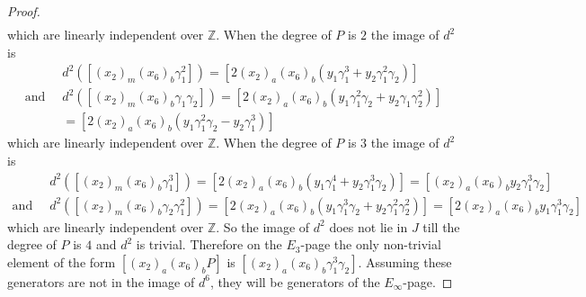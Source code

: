 \documentclass{article}
\theoremstyle{plain}
\theoremstyle{definition}
\numberwithin{thm}{section}
\begin{document}
\begin{proof}
\begin{align*}
			\end{align*}
			which are linearly independent over $\mathbb{Z}$.
			When the degree of $P$ is $2$ the image of $d^2$ is
			\begin{align*}
												&d^2([(x_2)_m(x_6)_b\gamma_1^2])=[2(x_2)_a(x_6)_b(y_1\gamma_1^3+y_2\gamma_1^2\gamma_2)] \\
				\text{and} \;\; &d^2([(x_2)_m(x_6)_b\gamma_1\gamma_2])=[2(x_2)_a(x_6)_b(y_1\gamma_1^2\gamma_2+y_2\gamma_1\gamma_2^2)] \\
																															&=[2(x_2)_a(x_6)_b(y_1\gamma_1^2\gamma_2-y_2\gamma_1^3)]
			\end{align*}
			which are linearly independent over $\mathbb{Z}$.
			When the degree of $P$ is $3$ the image of $d^2$ is
			\begin{align}\label{eq:d2dim4}
												&d^2([(x_2)_m(x_6)_b\gamma_1^3])=[2(x_2)_a(x_6)_b(y_1\gamma_1^4+y_2\gamma_1^3\gamma_2)]=[(x_2)_a(x_6)_by_2\gamma_1^3\gamma_2] \nonumber\\
				\text{and} \;\; &d^2([(x_2)_m(x_6)_b\gamma_2\gamma_1^2])=[2(x_2)_a(x_6)_b(y_1\gamma_1^3\gamma_2+y_2\gamma_1^2\gamma_2^2)]
																																=[2(x_2)_a(x_6)_by_1\gamma_1^3\gamma_2] 
			\end{align}
			which are linearly independent over $\mathbb{Z}$.
			So the image of $d^2$ does not lie in $J$ till the degree of $P$ is $4$ and $d^2$ is trivial.
			Therefore on the $E_3$-page the only non-trivial element of the form $[(x_2)_a(x_6)_bP]$ is $[(x_2)_a(x_6)_b\gamma_1^3\gamma_2]$.
			Assuming these generators are not in the image of $d^6$, they will be generators of the $E_\infty$-page.
			

\end{proof}
\end{document}
